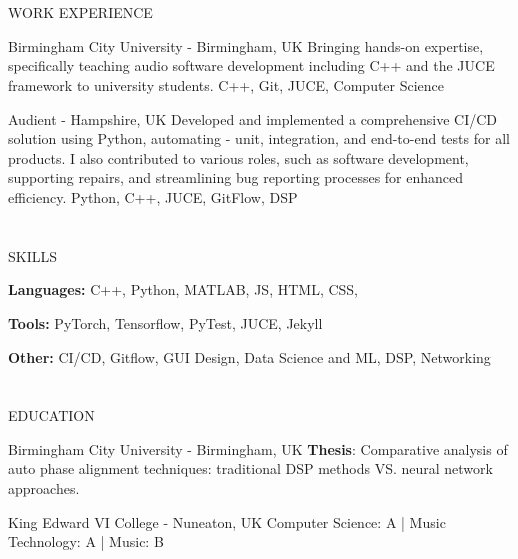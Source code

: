 \documentclass{my_cv}
\begin{document}
\begin{multicols}{2}
\section{\faPencil}{WORK EXPERIENCE}

%
    {Birmingham City University - Birmingham, UK}%
    {Bringing hands-on expertise, specifically teaching audio software development including C++ and the JUCE framework to university students.}%
    {C++, Git, JUCE, Computer Science}
    
%
    {Audient - Hampshire, UK}%
    {Developed and implemented a comprehensive CI/CD solution using Python, automating - unit, integration, and end-to-end tests for all products. I also contributed to various roles, such as software development, supporting repairs, and streamlining bug reporting processes for enhanced efficiency.}
    {Python, C++, JUCE, GitFlow, DSP}
    
\section{\faList}{SKILLS}

\textbf{Languages:} C++, Python, MATLAB, JS, HTML, CSS,

\noindent\textbf{Tools:} PyTorch, Tensorflow, PyTest, JUCE, Jekyll

\noindent\textbf{Other:} CI/CD, Gitflow, GUI Design, Data Science and ML, DSP, Networking

\section{\faGraduationCap}{EDUCATION}
    
{Birmingham City University - Birmingham, UK} %
{\textbf{{Thesis}}: Comparative analysis of auto phase alignment techniques: traditional DSP methods VS. neural network approaches.}
    
{King Edward VI College - Nuneaton, UK} %
{Computer Science: A
| Music Technology: A
| Music: B}


\end{multicols}
\end{document}
